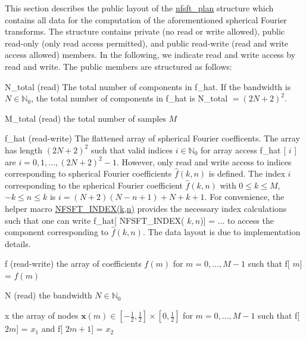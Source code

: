 This section describes the public layout of the \hyperlink{structnfsft__plan}{nfsft\-\_\-plan} structure which contains all data for the computation of the aforementioned spherical Fourier transforms. The structure contains private (no read or write allowed), public read-\/only (only read access permitted), and public read-\/write (read and write access allowed) members. In the following, we indicate read and write access by {\ttfamily read} and {\ttfamily write}. The public members are structured as follows\-: \begin{DoxyItemize}
\item {\ttfamily N\-\_\-total} ({\ttfamily read}) The total number of components in {\ttfamily f\-\_\-hat}. If the bandwidth is $N \in \mathbb{N}_0$, the total number of components in {\ttfamily f\-\_\-hat} is {\ttfamily N\-\_\-total} $ = (2N+2)^2$. \item {\ttfamily M\-\_\-total} ({\ttfamily read}) the total number of samples $M$ \item {\ttfamily f\-\_\-hat} ({\ttfamily read-\/write}) The flattened array of spherical Fourier coefficents. The array has length $(2N+2)^2$ such that valid indices $i \in \mathbb{N}_0$ for array access {\ttfamily f\-\_\-hat} {\ttfamily }\mbox{[} $i$ {\ttfamily }\mbox{]} are $i=0,1,\ldots,(2N+2)^2-1$. However, only read and write access to indices corresponding to spherical Fourier coefficients $\hat{f}(k,n)$ is defined. The index $i$ corresponding to the spherical Fourier coefficient $\hat{f}(k,n)$ with $0 \le k \le M$, $-k \le n \le k$ is $i = (N+2)(N-n+1)+N+k+1$. For convenience, the helper macro \hyperlink{group__nfsft_ga8be22087991e0a82cfa59a3f0f2a5e86}{N\-F\-S\-F\-T\-\_\-\-I\-N\-D\-E\-X(k,n)} provides the necessary index calculations such that one can write {\ttfamily f\-\_\-hat}\mbox{[} {\ttfamily N\-F\-S\-F\-T\-\_\-\-I\-N\-D\-E\-X}( $k,n${\ttfamily })\mbox{]} {\ttfamily =} {\ttfamily }... to access the component corresponding to $\hat{f}(k,n)$. The data layout is due to implementation details. \item {\ttfamily f} ({\ttfamily read-\/write}) the array of coefficients $f(m)$ for $m=0,\ldots,M-1$ such that {\ttfamily f}\mbox{[} $m${\ttfamily }\mbox{]} = $f(m)$ \item {\ttfamily N} ({\ttfamily read}) the bandwidth $N \in \mathbb{N}_0$ \item {\ttfamily x} the array of nodes $\mathbf{x}(m) \in [-\frac{1}{2},\frac{1}{2}] \times [0,\frac{1}{2}]$ for $m = 0, \ldots,M-1$ such that {\ttfamily f}\mbox{[} $2m${\ttfamily }\mbox{]} = $x_1$ and {\ttfamily f}\mbox{[} $2m+1${\ttfamily }\mbox{]} = $x_2$\end{DoxyItemize}

